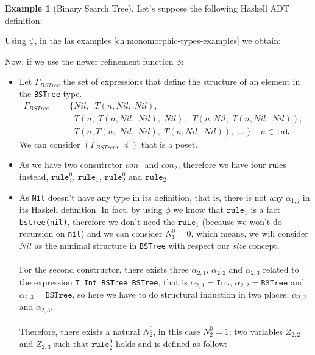 \documentclass{report}
\theoremstyle{definition}
\newtheorem{example}{Example}[section]
\theoremstyle{definition}
\newcommand{\ttt}[1]{\texttt{#1}}
\newcommand{\tav}{\;\;}
\begin{document}
	\begin{example}[Binary Search Tree]
		Let's suppose the following Haskell ADT definition:
		
		Using $\psi$, in the las examples \ref{ch:monomorphic-types-examples} we obtain:
		
		Now, if we use the newer refinement function $\phi$:
		\begin{itemize}
			\item Let $\Gamma_{BSTree}$ the set of expressions that define the structure of an element in the \ttt{BSTree} type.
			      \begin{eqnarray*}
			      	\Gamma_{BSTree} & = & \{ Nil, \tav T(n, Nil, \; Nil), \\
			      	&& \tav T(n, \; T(n, Nil, \; Nil), \; Nil), \tav T(n, Nil, \; T(n, Nil, \; Nil)), \tav  \\
			      	&& \tav T(n, T(n, \; Nil, \; Nil), \; T(n, Nil, \; Nil)), \; \ldots \; \} \tav \tav n \in \ttt{Int}
			      \end{eqnarray*}
			      We can consider $(\Gamma_{BSTree}, \preceq)$ that is a poset.
			\item As we have two consutrctor $con_1$ and $con_2$, therefore we have four rules instead, $\ttt{rule}_{1}^{0}$, $\ttt{rule}_1$, $\ttt{rule}_{2}^{0}$ and $\ttt{rule}_2$.
			\item As \ttt{Nil} doesn't have any type in its definition, that is, there is not any $\alpha_{1,j}$ in its Haskell definition. In fact, by using $\phi$ we know that $\ttt{rule}_1$ is a fact \ttt{bstree(nil)}, therefore we don't need the $\ttt{rule}_1$ (because we won't do recursion on \ttt{nil}) and we can consider $N_{1}^{0} = 0$, which means, we will consider $Nil$ as the minimal structure in \ttt{BSTree} with respect our \textit{size} concept.\\\\
			      For the second constructor, there exists three $\alpha_{2,1}$, $\alpha_{2,2}$ and $\alpha_{2,3}$ related to the expression \ttt{T Int BSTree BSTree}, that is $\alpha_{2,1} = \ttt{Int}$, $\alpha_{2,2} = \ttt{BSTree}$ and $\alpha_{2,3} = \ttt{BSTree}$, so here we have to do structural induction in two places: $\alpha_{2,2}$ and $\alpha_{2,3}$.\\\\
			      Therefore, there exists a natural $N_{2}^{0}$, in this case $N_{2}^{0} = 1$; two variables $Z_{2,2}$ and $Z_{2,3}$ such that $\ttt{rule}_{2}^{0}$ holds and is defined as follow:

\end{itemize}
\end{example}
\end{document}
